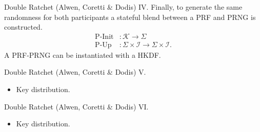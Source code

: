 \documentclass{beamer}
\renewcommand{\t}{\text}
\begin{document}
\begin{frame}{Double Ratchet (Alwen, Coretti \& Dodis) IV.}
  Finally, to generate the same randomness for both participants a stateful
  blend between a PRF and PRNG is constructed.
  \begin{align*}
    \t{P-Init} & : \mathcal{K} \rightarrow \Sigma \\
    \t{P-Up} & : \Sigma \times \mathcal{I} \rightarrow \Sigma \times \mathcal{I}.
  \end{align*}
  A PRF-PRNG can be instantiated with a HKDF.
\end{frame}

\begin{frame}{Double Ratchet (Alwen, Coretti \& Dodis) V.}
  \scriptsize
   \begin{minipage}[h]{0.49\textwidth}
      \begin{figure}[h]
        \centering
        \setlength{\fboxsep}{10pt}
        \scalebox{0.7}{%
        \fbox{%
          
        }
      }
    \end{figure}
    \end{minipage}
   \begin{minipage}[h]{0.49\textwidth}
      \begin{itemize}
      \item Key distribution.
      \end{itemize}
  \end{minipage}
\end{frame}

\begin{frame}{Double Ratchet (Alwen, Coretti \& Dodis) VI.}
  \scriptsize
   \begin{minipage}[h]{0.49\textwidth}
      \begin{figure}[h]
        \centering
        \setlength{\fboxsep}{10pt}
        \scalebox{0.7}{%
        \fbox{%
          
        }
      }
    \end{figure}
    \end{minipage}
   \begin{minipage}[h]{0.49\textwidth}
      \begin{itemize}
      \item Key distribution.
      \end{itemize}
  \end{minipage}
\end{frame}
\end{document}
